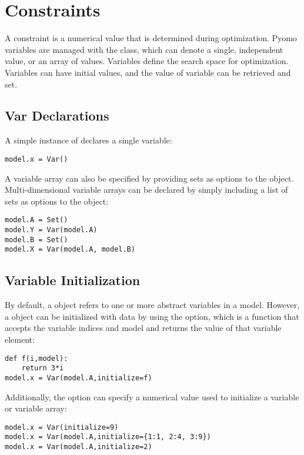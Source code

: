 \section{Constraints}

A constraint is a numerical value that is determined during optimization.
Pyomo variables are managed with the  class, which can denote
a single, independent value, or an array of values.  Variables define
the search space for optimization.  Variables can have initial values,
and the value of variable can be retrieved and set.


\subsection{Var Declarations}

A simple instance of  declares a single variable:
\begin{lstlisting}
model.x = Var()
\end{lstlisting}
A variable array can also be specified by providing sets as options
to the  object.  Multi-dimensional variable arrays can be declared by simply including a list of sets as options to the  object:
\begin{lstlisting}
model.A = Set()
model.Y = Var(model.A)
model.B = Set()
model.X = Var(model.A, model.B)
\end{lstlisting}


\subsection{Variable Initialization}

By default, a  object refers to one or more abstract variables in a model.  However,
a  object can be initialized with data by using the  option, which is a function 
that accepts the variable indices and model and returns the value of that variable element:
\begin{lstlisting}
def f(i,model):
    return 3*i
model.x = Var(model.A,initialize=f)
\end{lstlisting}
Additionally, the  option can specify a numerical value used to 
initialize a variable or variable array:
\begin{lstlisting}
model.x = Var(initialize=9)
model.x = Var(model.A,initialize={1:1, 2:4, 3:9})
model.x = Var(model.A,initialize=2)
\end{lstlisting}


